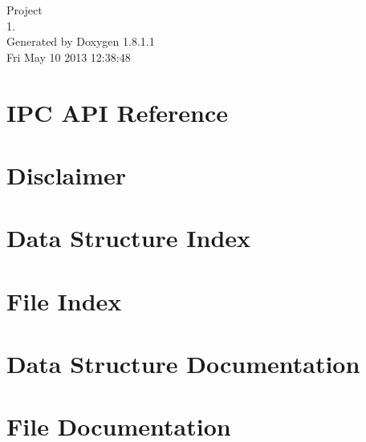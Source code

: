 \documentclass{article}
\begin{document}
\begin{titlepage}
\vspace*{7cm}
\begin{center}
{\Large Project \\[1ex]\large 1. }\\
\vspace*{1cm}
{\large Generated by Doxygen 1.8.1.1}\\
\vspace*{0.5cm}
{\small Fri May 10 2013 12:38:48}\\
\end{center}
\end{titlepage}
\tableofcontents
{}
\section{I\-P\-C A\-P\-I Reference}
\label{index}\hypertarget{index}{}
\section{Disclaimer}
\label{Disclaimer}

\section{Data Structure Index}

\section{File Index}

\section{Data Structure Documentation}















\section{File Documentation}













\printindex
\end{document}
